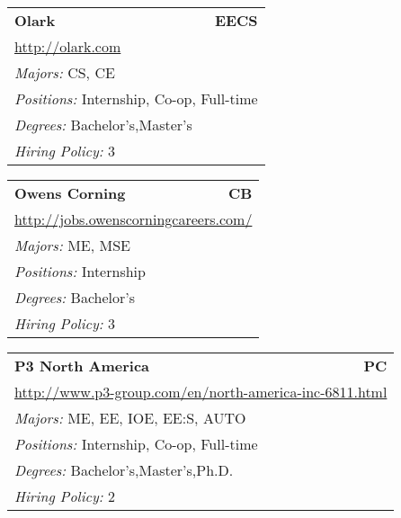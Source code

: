 \documentclass[twoside]{article}
\begin{document}
\begin{center}
\begin{multicols}{3}
\begin{FlushLeft}
\begin{minipage}{.9\columnwidth}
\end{minipage}
 
\begin{minipage}{.9\columnwidth}\begin{tabularx}{.95\columnwidth}{Xr}
                 {\Large\bf Olark} & {\Large\bf EECS}\\
    \multicolumn{2}{p{.95\columnwidth}}{\url{http://olark.com}}\\
    \multicolumn{2}{p{.95\columnwidth}}{\emph{Majors:} CS, CE}\\
    \multicolumn{2}{p{.95\columnwidth}}{\emph{Positions:} Internship, Co-op, Full-time}\\
    \multicolumn{2}{p{.95\columnwidth}}{\emph{Degrees:} Bachelor's,Master's}\\
    \multicolumn{2}{p{.95\columnwidth}}{\emph{Hiring Policy:} 3}\\
    \end{tabularx}
    
\end{minipage}
 
\begin{minipage}{.9\columnwidth}\begin{tabularx}{.95\columnwidth}{Xr}
                 {\Large\bf Owens Corning} & {\Large\bf CB}\\
    \multicolumn{2}{p{.95\columnwidth}}{\url{http://jobs.owenscorningcareers.com/}}\\
    \multicolumn{2}{p{.95\columnwidth}}{\emph{Majors:} ME, MSE}\\
    \multicolumn{2}{p{.95\columnwidth}}{\emph{Positions:} Internship}\\
    \multicolumn{2}{p{.95\columnwidth}}{\emph{Degrees:} Bachelor's}\\
    \multicolumn{2}{p{.95\columnwidth}}{\emph{Hiring Policy:} 3}\\
    \end{tabularx}
    
\end{minipage}
 
\begin{minipage}{.9\columnwidth}\begin{tabularx}{.95\columnwidth}{Xr}
                 {\Large\bf P3 North America} & {\Large\bf PC}\\
    \multicolumn{2}{p{.95\columnwidth}}{\url{http://www.p3-group.com/en/north-america-inc-6811.html}}\\
    \multicolumn{2}{p{.95\columnwidth}}{\emph{Majors:} ME, EE, IOE, EE:S, AUTO}\\
    \multicolumn{2}{p{.95\columnwidth}}{\emph{Positions:} Internship, Co-op, Full-time}\\
    \multicolumn{2}{p{.95\columnwidth}}{\emph{Degrees:} Bachelor's,Master's,Ph.D.}\\
    \multicolumn{2}{p{.95\columnwidth}}{\emph{Hiring Policy:} 2}\\
    \end{tabularx}
    

\end{minipage}
\end{FlushLeft}
\end{multicols}
\end{center}
\end{document}
